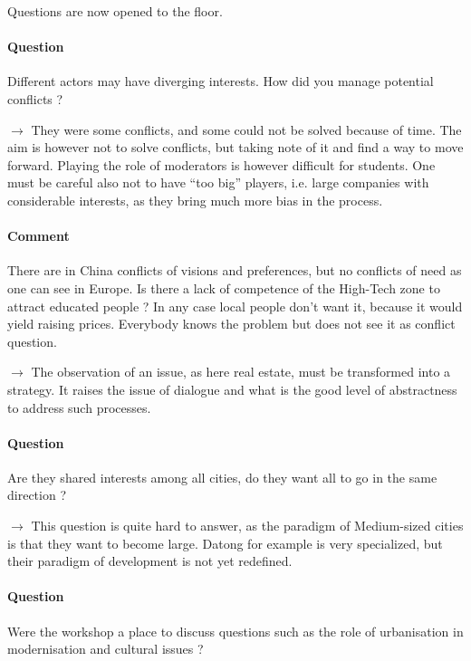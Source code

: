 \documentclass[10pt]{article}
\begin{document}
Questions are now opened to the floor.


\paragraph{Question}

Different actors may have diverging interests. How did you manage potential conflicts ?

$\rightarrow$ They were some conflicts, and some could not be solved because of time. The aim is however not to solve conflicts, but taking note of it and find a way to move forward. Playing the role of moderators is however difficult for students. One must be careful also not to have ``too big'' players, i.e. large companies with considerable interests, as they bring much more bias in the process.


\paragraph{Comment}

There are in China conflicts of visions and preferences, but no conflicts of need as one can see in Europe. Is there a lack of competence of the High-Tech zone to attract educated people ? In any case local people don't want it, because it would yield raising prices. Everybody knows the problem but does not see it as conflict question.

$\rightarrow$ The observation of an issue, as here real estate, must be transformed into a strategy. It raises the issue of dialogue and what is the good level of abstractness to address such processes.


\paragraph{Question}

Are they shared interests among all cities, do they want all to go in the same direction ? 

$\rightarrow$ This question is quite hard to answer, as the paradigm of Medium-sized cities is that they want to become large. Datong for example is very specialized, but their paradigm of development is not yet redefined.


\paragraph{Question}

Were the workshop a place to discuss questions such as the role of urbanisation in modernisation and cultural issues ?
\end{document}
